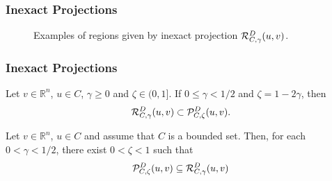 \begin{frame}[t]\frametitle{Inexact Projections}\bigskip   
\begin{figure}[H]
  \begin{subfigmatrix}{3}
  \end{subfigmatrix}
  \caption{Examples of regions given by inexact projection ${\cal R}_{C,\gamma}^{D}(u, v)$.}
  \label{fig:baseline}
\end{figure}
\end{frame}


\begin{frame}[t]\frametitle{Inexact Projections}
  \begin{lemma}[2.14]
    Let $v \in {\mathbb R}^n$, $u \in C$, $\gamma \geq 0$  and $\zeta\in (0, 1]$.  If  $0 \leq \gamma <1/2$ and $\zeta=1-2\gamma$, then
    \[
      {\cal R}_{C,\gamma}^{D}(u, v) \subset {\cal P}_{C,\zeta}^{D}(u, v).
    \]
  \end{lemma}

  \begin{proposition}[2.17]
    Let $v \in {\mathbb R}^n$, $u \in C$ and assume that $C$ is a bounded set. Then, for each $0<\gamma < 1/2$,     there exist $0 < \zeta  <1$ such that
    \[
      {\cal P}_{C,\zeta}^{D}(u, v)  \subseteq    {\cal R}_{C,\gamma}^{D}(u, v)
    \]
  \end{proposition}
\end{frame}


